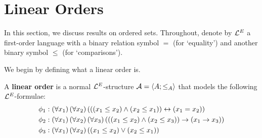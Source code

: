 \section{Linear Orders}

In this section, we discuss results on ordered sets. Throughout, denote by $\mathcal{L}^{E}$ a first-order language with a binary relation symbol $=$ (for `equality') and another binary symbol $\le$ (for `comparisons').

We begin by defining what a linear order is.

\begin{boxdefinition}
    A \textbf{linear order} is a normal $\mathcal{L}^{E}$-structure $\mathcal{A} = \left\langle A; \le_{A} \right\rangle$ that models the following $\mathcal{L}^{E}$-formulae:
    \begin{align*}
        \phi_1 &: \left( \forall x_1 \right)\left( \forall x_2 \right)\left( \left( \left( x_1 \le x_2 \right) \land \left( x_2 \le x_1 \right) \right) \leftrightarrow \left( x_1 = x_2 \right) \right) \\
        \phi_2 &: \left( \forall x_1 \right)\left( \forall x_2 \right)\left( \forall x_3 \right)\left( \left( \left( x_1 \le x_2 \right) \land \left( x_2 \le x_3 \right) \right) \to \left( x_1 \to x_3 \right) \right) \\
        \phi_3 &: \left( \forall x_1 \right) \left( \forall x_2 \right) \left( \left( x_1 \le x_2 \right) \lor \left( x_2 \le x_1 \right) \right)
    \end{align*}
\end{boxdefinition}